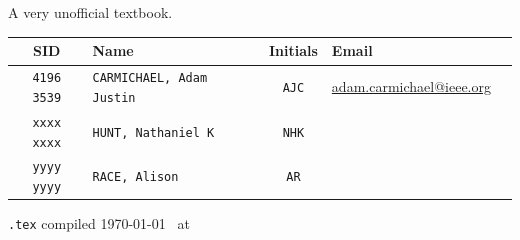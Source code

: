 \begin{titlingpage}
\begin{center}

\textsc{\LARGE \MyInstitution }\\[1.5cm]
\HRule \\[0.9cm]

{ \huge \bfseries \MyTitle }\\[0.4cm] \HRule \\
{ \small{A very unofficial textbook.} }
\vfill

\begin{tabularx}{\linewidth}{ c X c X X }
\hline
  SID & Name & Initials & Email \\
  \hline
  \texttt{4196 3539} & \texttt{CARMICHAEL, Adam Justin}  & \texttt{AJC} & \url{adam.carmichael@ieee.org} \\
  \texttt{xxxx xxxx} & \texttt{HUNT, Nathaniel K} & \texttt{NHK} & \\
  \texttt{yyyy yyyy} & \texttt{RACE, Alison} & \texttt{AR} &
\end{tabularx}

\vspace{1cm}
\small{\texttt{\jobname.tex} compiled \today ~ at \currenttime}
\end{center}

\end{titlingpage}